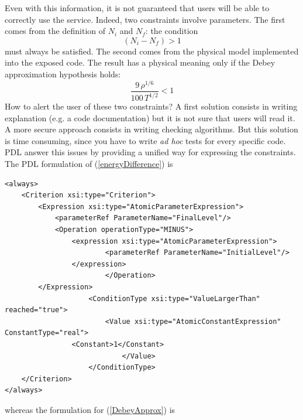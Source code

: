 \documentclass[a4paper,11pt] {ivoa}
\begin{document}
Even with this information, it is not guaranteed that users will be able to correctly use the service. Indeed, two constraints involve parameters. The first comes from the definition of $N_i$ and $N_f$: the condition
\begin{equation}\label{energyDifference}
(N_i-N_f)>1
\end{equation}
must always be satisfied. The second comes from the physical model implemented into the exposed code. The result has a physical meaning only if the Debey approximation hypothesis holds:
\begin{equation}\label{DebeyApprox}
\frac{9 \, \rho^{1/6}}{100 \, T^{1/2} }<1
\end{equation}
How to alert the user of these two constraints? A first solution consists in writing explanation (e.g. a code documentation) but it is not sure that users will read it. A more secure approach consists in writing checking algorithms. But this solution is time consuming, since you have to write {\it ad hoc} tests for every specific code. 
PDL answer this issues by providing a unified way for expressing the constraints. The PDL formulation of (\ref{energyDifference}) is 
\begin{lstlisting}[style=listXML]
<always>
	<Criterion xsi:type="Criterion">
 		<Expression xsi:type="AtomicParameterExpression">
			<parameterRef ParameterName="FinalLevel"/>
			<Operation operationType="MINUS">
				<expression xsi:type="AtomicParameterExpression">
    					<parameterRef ParameterName="InitialLevel"/>
				</expression>
                    	</Operation>
		</Expression>
                    <ConditionType xsi:type="ValueLargerThan" reached="true">
                    	<Value xsi:type="AtomicConstantExpression" ConstantType="real">
				<Constant>1</Constant>
                            </Value>
                    </ConditionType> 
 	</Criterion>
</always>
\end{lstlisting}
whereas the formulation for (\ref{DebeyApprox}) is
\end{document}
